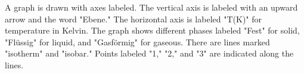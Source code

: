 A graph is drawn with axes labeled. The vertical axis is labeled with an upward arrow and the word "Ebene." The horizontal axis is labeled "T(K)" for temperature in Kelvin. The graph shows different phases labeled "Fest" for solid, "Flüssig" for liquid, and "Gasförmig" for gaseous. There are lines marked "isotherm" and "isobar." Points labeled "1," "2," and "3" are indicated along the lines.